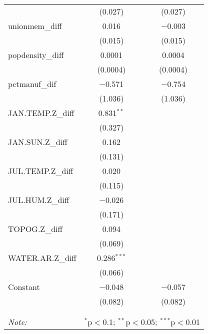 \begin{table}[!htbp]
\begin{tabular}{@{\extracolsep{5pt}}lcc}
  & (0.027) & (0.027) \\ 
  unionmem\_diff & 0.016 & $-$0.003 \\ 
  & (0.015) & (0.015) \\ 
  popdensity\_diff & 0.0001 & 0.0004 \\ 
  & (0.0004) & (0.0004) \\ 
  pctmanuf\_dif & $-$0.571 & $-$0.754 \\ 
  & (1.036) & (1.036) \\ 
  JAN.TEMP.Z\_diff & 0.831$^{**}$ &  \\ 
  & (0.327) &  \\ 
  JAN.SUN.Z\_diff & 0.162 &  \\ 
  & (0.131) &  \\ 
  JUL.TEMP.Z\_diff & 0.020 &  \\ 
  & (0.115) &  \\ 
  JUL.HUM.Z\_diff & $-$0.026 &  \\ 
  & (0.171) &  \\ 
  TOPOG.Z\_diff & 0.094 &  \\ 
  & (0.069) &  \\ 
  WATER.AR.Z\_diff & 0.286$^{***}$ &  \\ 
  & (0.066) &  \\ 
  Constant & $-$0.048 & $-$0.057 \\ 
  & (0.082) & (0.082) \\ 
 \hline \\[-1.8ex] 
\hline 
\hline \\[-1.8ex] 
\textit{Note:}  & \multicolumn{2}{r}{$^{*}$p$<$0.1; $^{**}$p$<$0.05; $^{***}$p$<$0.01} \\ 
\end{tabular} 
\end{table} 
